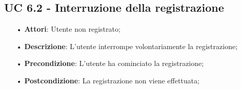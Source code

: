 \subsection{UC 6.2 - Interruzione della registrazione}
\begin{itemize}
\item[•]\textbf{Attori}: Utente non registrato;
\item[•]\textbf{Descrizione}: L’utente interrompe volontariamente la registrazione;
\item[•]\textbf{Precondizione}: L’utente ha cominciato la registrazione;
\item[•]\textbf{Postcondizione}: La registrazione non viene effettuata;
\end{itemize}
